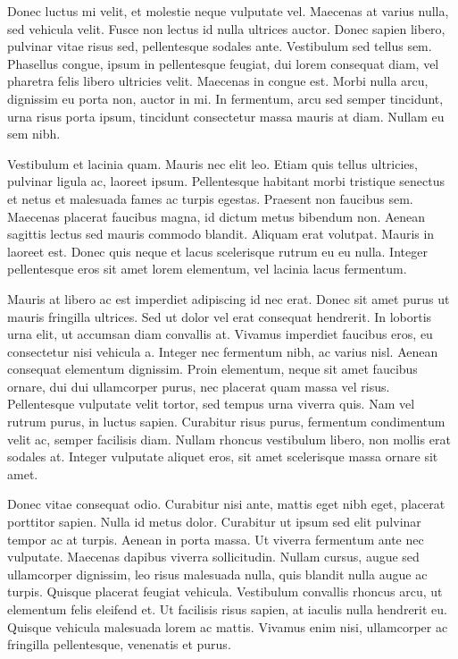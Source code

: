Donec luctus mi velit, et molestie neque vulputate vel. Maecenas at varius nulla, sed vehicula velit. Fusce non lectus id nulla ultrices auctor. Donec sapien libero, pulvinar vitae risus sed, pellentesque sodales ante. Vestibulum sed tellus sem. Phasellus congue, ipsum in pellentesque feugiat, dui lorem consequat diam, vel pharetra felis libero ultricies velit. Maecenas in congue est. Morbi nulla arcu, dignissim eu porta non, auctor in mi. In fermentum, arcu sed semper tincidunt, urna risus porta ipsum, tincidunt consectetur massa mauris at diam. Nullam eu sem nibh.

Vestibulum et lacinia quam. Mauris nec elit leo. Etiam quis tellus ultricies, pulvinar ligula ac, laoreet ipsum. Pellentesque habitant morbi tristique senectus et netus et malesuada fames ac turpis egestas. Praesent non faucibus sem. Maecenas placerat faucibus magna, id dictum metus bibendum non. Aenean sagittis lectus sed mauris commodo blandit. Aliquam erat volutpat. Mauris in laoreet est. Donec quis neque et lacus scelerisque rutrum eu eu nulla. Integer pellentesque eros sit amet lorem elementum, vel lacinia lacus fermentum.

Mauris at libero ac est imperdiet adipiscing id nec erat. Donec sit amet purus ut mauris fringilla ultrices. Sed ut dolor vel erat consequat hendrerit. In lobortis urna elit, ut accumsan diam convallis at. Vivamus imperdiet faucibus eros, eu consectetur nisi vehicula a. Integer nec fermentum nibh, ac varius nisl. Aenean consequat elementum dignissim. Proin elementum, neque sit amet faucibus ornare, dui dui ullamcorper purus, nec placerat quam massa vel risus. Pellentesque vulputate velit tortor, sed tempus urna viverra quis. Nam vel rutrum purus, in luctus sapien. Curabitur risus purus, fermentum condimentum velit ac, semper facilisis diam. Nullam rhoncus vestibulum libero, non mollis erat sodales at. Integer vulputate aliquet eros, sit amet scelerisque massa ornare sit amet.

Donec vitae consequat odio. Curabitur nisi ante, mattis eget nibh eget, placerat porttitor sapien. Nulla id metus dolor. Curabitur ut ipsum sed elit pulvinar tempor ac at turpis. Aenean in porta massa. Ut viverra fermentum ante nec vulputate. Maecenas dapibus viverra sollicitudin. Nullam cursus, augue sed ullamcorper dignissim, leo risus malesuada nulla, quis blandit nulla augue ac turpis. Quisque placerat feugiat vehicula. Vestibulum convallis rhoncus arcu, ut elementum felis eleifend et. Ut facilisis risus sapien, at iaculis nulla hendrerit eu. Quisque vehicula malesuada lorem ac mattis. Vivamus enim nisi, ullamcorper ac fringilla pellentesque, venenatis et purus.

